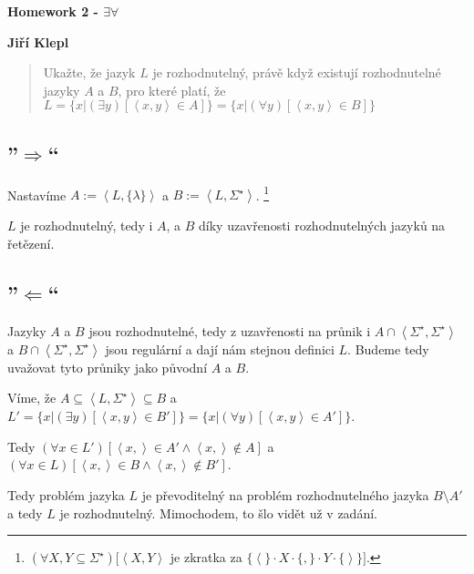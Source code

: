 \documentclass[a4paper,12pt]{article} %
\begin{document}
\thispagestyle{empty} %

\begin{center}
	{\Large \bf Homework 2 - $\exists\forall$}
	\vspace{2mm}
	
	{\bf Jiří Klepl}
		
\end{center}  

\vspace{0.4cm}


\begin{quote}
Ukažte, že jazyk $L$ je rozhodnutelný, právě když existují rozhodnutelné jazyky $A$ a $B$, pro které platí, že $L=\{x | (\exists y)[\left<x, y\right> \in A]\} = \{x | (\forall y)[\left<x,y\right> \in B]\}$
\end{quote}

\subsection*{''$\Rightarrow$``}

Nastavíme $A := \left<L, \{\lambda\}\right>$ a $B := \left<L,\Sigma^\star\right>$.
\footnote{$(\forall X, Y \subseteq \Sigma^\star)[\label{foot} \left< X, Y\right>$ je zkratka za $\{\left<\right.\} \cdot X \cdot \{,\} \cdot Y \cdot \{\left.\right>\}]$.}

$L$ je rozhodnutelný, tedy i $A$, a $B$ díky uzavřenosti rozhodnutelných jazyků na řetězení.

\subsection*{''$\Leftarrow$``}

Jazyky $A$ a $B$ jsou rozhodnutelné, tedy z uzavřenosti na průnik i $A \cap \left<\Sigma^\star, \Sigma^\star\right>$ a $B \cap \left<\Sigma^\star, \Sigma^\star\right>$ jsou regulární a dají nám stejnou definici $L$. Budeme tedy uvažovat tyto průniky jako původní $A$ a $B$.

Víme, že $A \subseteq \left<L,\Sigma^\star\right> \subseteq B$ a $L' = \{x | (\exists y)[\left<x, y\right> \in B']\} = \{x | (\forall y)[\left<x,y\right> \in A']\}$.

Tedy $(\forall x \in L')[\left<x,\right> \in A' \wedge \left<x,\right> \not\in A]$ a $(\forall x \in L)[\left<x,\right> \in B \wedge \left<x,\right> \not\in B']$.

Tedy problém jazyka $L$ je převoditelný na problém rozhodnutelného jazyka $B \setminus A'$ a tedy $L$ je rozhodnutelný. Mimochodem, to šlo vidět už v zadání.
\end{document}
